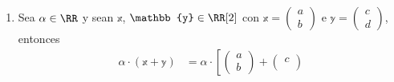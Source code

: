\begin{examplebox}{}{}
\begin{enumerate}[label=\roman*), topsep=6pt, itemsep=0pt]
\begin{align*}
\begin{pmatrix}
                a \\
                b
            \end{pmatrix} \right] \\
            & = \alpha \cdot \left[ \begin{pmatrix}
                \beta a \\
                \beta b
            \end{pmatrix} \right] && \text{por def. de producto} \\
            & = \begin{pmatrix}
                \alpha (\beta a) \\
                \alpha (\beta b)
            \end{pmatrix} && \text{por def. de producto} \\
            & = \begin{pmatrix}
                (\alpha \beta) a \\
                (\alpha \beta) b
            \end{pmatrix} && \text{por asociatividad en $\RR$} \\
            & = (\alpha\beta) \cdot \begin{pmatrix}
                a \\
                b
            \end{pmatrix} && \text{por def. de producto} \\
            & = (\alpha\beta) \cdot \mathbb{x}
        \end{align*}
        Por tanto, se cumple la asociatividad.
        \item Sea $\alpha \in \RR$ y sean $\mathbb{x}$, $\mathbb{y} \in \RR[2]$ con $\mathbb{x} = \begin{pmatrix}
            a \\
            b
        \end{pmatrix}$ e $\mathbb{y} = \begin{pmatrix}
            c \\
            d
        \end{pmatrix}$, entonces
        \begin{align*}
            \alpha \cdot (\mathbb{x} + \mathbb{y}) & = \alpha \cdot \left[ \begin{pmatrix}
                a \\
                b
            \end{pmatrix} + \begin{pmatrix}
                c \\

\end{pmatrix}
\end{align*}
\end{enumerate}
\end{examplebox}
